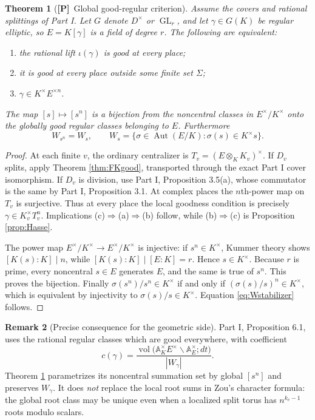 \documentclass[11pt]{article}
\newcommand{\A}{\mathbb A}
\newcommand{\GL}{\operatorname{GL}}
\newcommand{\vol}{\operatorname{vol}}
\newcommand{\Aut}{\operatorname{Aut}}
\newcommand{\Ptag}{\textnormal{\textbf{[P]}}}
\theoremstyle{plain}
\newtheorem{theorem}{Theorem}[section]
\theoremstyle{definition}
\newtheorem{remark}[theorem]{Remark}
\begin{document}
\begin{theorem}[\Ptag\ Global good-regular criterion]\label{thm:globalgood}
Assume the covers and rational splittings of Part I.  Let
$G$ denote $D^\times$ or $\GL_r$, and let $\gamma\in G(K)$ be
regular elliptic, so $E=K[\gamma]$ is a field of degree $r$.
The following are equivalent:
\begin{enumerate}[label=(\alph*)]
\item the rational lift $\iota(\gamma)$ is good at every place;
\item it is good at every place outside some finite set $\Sigma$;
\item $\gamma\in K^\times E^{\times n}$.
\end{enumerate}
The map $[s]\mapsto[s^n]$ is a bijection from the noncentral
classes in $E^\times/K^\times$ onto the globally good regular
classes belonging to $E$.  Furthermore
\begin{equation}\label{eq:Wstabilizer}
 W_{s^n}=W_s,\qquad
 W_s=\{\sigma\in\Aut(E/K):\sigma(s)\in K^\times s\}.
\end{equation}
\end{theorem}
\begin{proof}
At each finite $v$, the ordinary centralizer is
$T_v=(E\otimes_K K_v)^\times$.  If $D_v$ splits, apply
Theorem \ref{thm:FKgood}, transported through the exact Part I
cover isomorphism.  If $D_v$ is division, use Part I,
Proposition 3.5(a), whose commutator is the same by Part I,
Proposition 3.1.  At complex places the $n$th-power map on
$T_v$ is surjective.  Thus at every place the local goodness
condition is precisely
$\gamma\in K_v^\times T_v^n$.
Implications (c)$\Rightarrow$(a)$\Rightarrow$(b) follow,
while (b)$\Rightarrow$(c) is Proposition \ref{prop:Hasse}.

The power map $E^\times/K^\times\to E^\times/K^\times$
is injective: if $s^n\in K^\times$, Kummer theory shows
$[K(s):K]\mid n$, while $[K(s):K]\mid [E:K]=r$.
Hence $s\in K^\times$.  Because $r$ is prime, every noncentral
$s\in E$ generates $E$, and the same is true of $s^n$.
This proves the bijection.  Finally
$\sigma(s^n)/s^n\in K^\times$ if and only if
$(\sigma(s)/s)^n\in K^\times$, which is equivalent by injectivity
to $\sigma(s)/s\in K^\times$.  Equation \eqref{eq:Wstabilizer}
follows.
\end{proof}

\begin{remark}[Precise consequence for the geometric side]
Part I, Proposition 6.1, uses the rational regular classes which
are good everywhere, with coefficient
\begin{equation}\label{eq:globalvol}
 c(\gamma)=\frac{\vol\bigl(\A_K^\times E^\times\backslash
 \A_E^\times;dt\bigr)}{|W_\gamma|}.
\end{equation}
Theorem \ref{thm:globalgood} parametrizes its noncentral
summation set by global $[s^n]$ and preserves $W_\gamma$.
It does \emph{not} replace the local root sums in Zou's
character formula: the global root class may be unique even when
a localized split torus has $n^{k_v-1}$ roots modulo scalars.
\end{remark}
\end{document}
